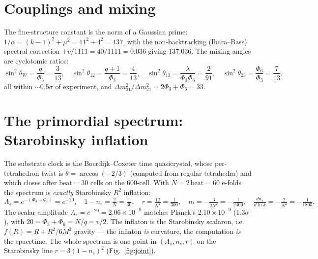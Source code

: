 \documentclass[11pt]{article}
\begin{document}
\section{Couplings and mixing}
The fine-structure constant is the norm of a Gaussian prime: $1/\alpha=(k-1)^2+\mu^2=11^2+4^2
=137$, with the non-backtracking (Ihara--Bass) spectral correction $+v/1111=40/1111=0.036$
giving $137.036$. The mixing angles are cyclotomic ratios:
\[
\sin^2\theta_W=\frac{q}{\Phi_3}=\frac{3}{13},\quad
\sin^2\theta_{12}=\frac{q+1}{\Phi_3}=\frac{4}{13},\quad
\sin^2\theta_{13}=\frac{\lambda}{\Phi_3\Phi_6}=\frac{2}{91},\quad
\sin^2\theta_{23}=\frac{\Phi_6}{\Phi_3}=\frac{7}{13},
\]
all within $\sim0.5\sigma$ of experiment, and $\Delta m^2_{31}/\Delta m^2_{21}=2\Phi_3+\Phi_6=33$.

\section{The primordial spectrum: Starobinsky inflation}
The substrate clock is the Boerdijk--Coxeter time quasicrystal, whose per-tetrahedron twist is
$\theta=\arccos(-2/3)$ (computed from regular tetrahedra) and which closes after
$\mathrm{beat}=30$ cells on the $600$-cell. With $N=2\,\mathrm{beat}=60$ e-folds the spectrum
is \emph{exactly} Starobinsky $R^2$ inflation:
\[
A_s=e^{-(\Phi_3+\Phi_6)}=e^{-20},\quad 1-n_s=\tfrac2N=\tfrac1{30},\quad r=\tfrac{12}{N^2}=\tfrac1{300},
\quad n_t=-\tfrac3{2N^2}=-\tfrac1{2400},\quad \tfrac{dn_s}{d\ln k}=-\tfrac2{N^2}=-\tfrac1{1800}.
\]
The scalar amplitude $A_s=e^{-20}=2.06\times10^{-9}$ matches Planck's $2.10\times10^{-9}$
($1.3\sigma$), with $20=\Phi_3+\Phi_6=N/q=v/2$. The inflaton is the Starobinsky scalaron, i.e.
$f(R)=R+R^2/6M^2$ gravity --- the inflaton \emph{is} curvature, the computation \emph{is} the
spacetime. The whole spectrum is one point in $(A_s,n_s,r)$ on the Starobinsky line
$r=3(1-n_s)^2$ (Fig.~\ref{fig:joint}).


\end{document}
